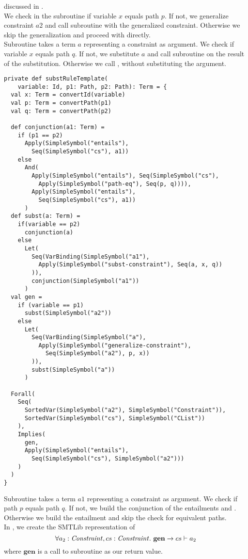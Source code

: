 discussed in .\\
We check in the subroutine 
if variable $x$ equals path $p$.
If not, we generalize constraint $a2$
and call subroutine 
with the generalized constraint.
Otherwise we skip the generalization and proceed
with  directly.\\
Subroutine  takes a term $a$
representing a constraint as argument.
We check if variable $x$ equals path $q$.
If not, we substitute $a$ and call
subroutine 
on the result of the substitution.
Otherwise we call ,
without substituting the argument.\\
%
\begin{lstlisting}[caption={C-Subst Template},label=lst:subst-template,captionpos=b,frame={lines}]
private def substRuleTemplate(
    variable: Id, p1: Path, p2: Path): Term = {
  val x: Term = convertId(variable)
  val p: Term = convertPath(p1)
  val q: Term = convertPath(p2)

  def conjunction(a1: Term) =
    if (p1 == p2)
      Apply(SimpleSymbol("entails"),
        Seq(SimpleSymbol("cs"), a1))
    else
      And(
        Apply(SimpleSymbol("entails"), Seq(SimpleSymbol("cs"),
          Apply(SimpleSymbol("path-eq"), Seq(p, q)))),
        Apply(SimpleSymbol("entails"),
          Seq(SimpleSymbol("cs"), a1))
      )
  def subst(a: Term) =
    if(variable == p2)
      conjunction(a)
    else
      Let(
        Seq(VarBinding(SimpleSymbol("a1"),
          Apply(SimpleSymbol("subst-constraint"), Seq(a, x, q))
        )),
        conjunction(SimpleSymbol("a1"))
      )
  val gen =
    if (variable == p1)
      subst(SimpleSymbol("a2"))
    else
      Let(
        Seq(VarBinding(SimpleSymbol("a"),
          Apply(SimpleSymbol("generalize-constraint"),
            Seq(SimpleSymbol("a2"), p, x))
        )),
        subst(SimpleSymbol("a"))
      )

  Forall(
    Seq(
      SortedVar(SimpleSymbol("a2"), SimpleSymbol("Constraint")),
      SortedVar(SimpleSymbol("cs"), SimpleSymbol("CList"))
    ),
    Implies(
      gen,
      Apply(SimpleSymbol("entails"),
        Seq(SimpleSymbol("cs"), SimpleSymbol("a2")))
    )
  )
}
\end{lstlisting}
Subroutine  takes
a term $a1$ representing a constraint as argument.
We check if path $p$ equals path $q$.
If not, we build the conjunction
of the entailments 
and .
Otherwise we build the entailment 
and skip the check for equivalent paths.\\
In ,
we create the SMTLib representation of
\[ \forall a_2: \mathit{Constraint}, cs: \mathit{Constraint}.\ \mathbf{gen} \rightarrow cs \vdash a_2 \]
where $\mathbf{gen}$ is a call to subroutine 
as our return value.

